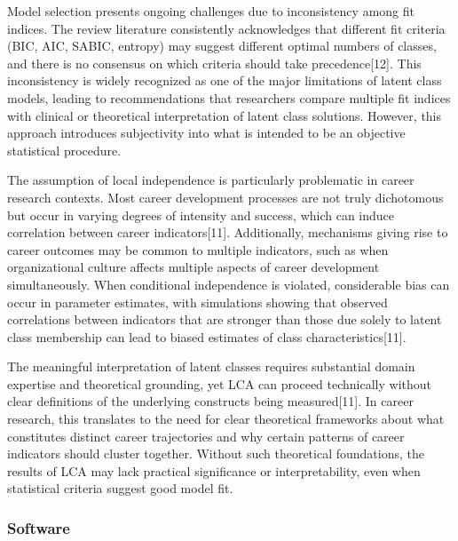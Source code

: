 \documentclass[main.tex]{subfiles}
\begin{document}
Model selection presents ongoing challenges due to inconsistency among fit indices. The review literature consistently acknowledges that different fit criteria (BIC, AIC, SABIC, entropy) may suggest different optimal numbers of classes, and there is no consensus on which criteria should take precedence[12]. This inconsistency is widely recognized as one of the major limitations of latent class models, leading to recommendations that researchers compare multiple fit indices with clinical or theoretical interpretation of latent class solutions. However, this approach introduces subjectivity into what is intended to be an objective statistical procedure.

The assumption of local independence is particularly problematic in career research contexts. Most career development processes are not truly dichotomous but occur in varying degrees of intensity and success, which can induce correlation between career indicators[11]. Additionally, mechanisms giving rise to career outcomes may be common to multiple indicators, such as when organizational culture affects multiple aspects of career development simultaneously. When conditional independence is violated, considerable bias can occur in parameter estimates, with simulations showing that observed correlations between indicators that are stronger than those due solely to latent class membership can lead to biased estimates of class characteristics[11].

The meaningful interpretation of latent classes requires substantial domain expertise and theoretical grounding, yet LCA can proceed technically without clear definitions of the underlying constructs being measured[11]. In career research, this translates to the need for clear theoretical frameworks about what constitutes distinct career trajectories and why certain patterns of career indicators should cluster together. Without such theoretical foundations, the results of LCA may lack practical significance or interpretability, even when statistical criteria suggest good model fit.

\subsubsection{Software}

\end{document}
